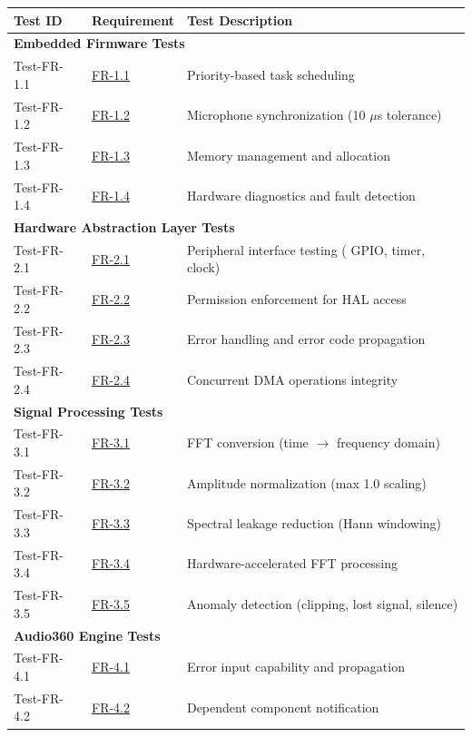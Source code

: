 \documentclass[12pt, titlepage]{article}
\begin{document}
{\small
\begin{longtable}{|p{2.5cm}|p{3cm}|p{8cm}|}
\hline
\textbf{Test ID} & \textbf{Requirement} & \textbf{Test Description} \\
\hline
\hline
\multicolumn{3}{|l|}{\textbf{Embedded Firmware Tests}} \\
\hline
Test-FR-1.1 & \hyperref[SRS-FR1_1]{FR-1.1} & Priority-based task scheduling \\
\hline
Test-FR-1.2 & \hyperref[SRS-FR1_2]{FR-1.2} & Microphone synchronization (10
$\mu$s tolerance) \\
\hline
Test-FR-1.3 & \hyperref[SRS-FR1_3]{FR-1.3} & Memory management and allocation \\
\hline
Test-FR-1.4 & \hyperref[SRS-FR1_4]{FR-1.4} & Hardware diagnostics and fault
detection \\
\hline
\hline
\multicolumn{3}{|l|}{\textbf{Hardware Abstraction Layer Tests}} \\
\hline
Test-FR-2.1 & \hyperref[SRS-FR2_1]{FR-2.1} & Peripheral interface testing (
GPIO, timer, clock) \\
\hline
Test-FR-2.2 & \hyperref[SRS-FR2_2]{FR-2.2} & Permission enforcement for HAL
access \\
\hline
Test-FR-2.3 & \hyperref[SRS-FR2_3]{FR-2.3} & Error handling and error code
propagation \\
\hline
Test-FR-2.4 & \hyperref[SRS-FR2_4]{FR-2.4} & Concurrent DMA operations integrity
\\
\hline
\hline
\multicolumn{3}{|l|}{\textbf{Signal Processing Tests}} \\
\hline
Test-FR-3.1 & \hyperref[SRS-FR3_1]{FR-3.1} & FFT conversion (time $\rightarrow$
frequency domain) \\
\hline
Test-FR-3.2 & \hyperref[SRS-FR3_2]{FR-3.2} & Amplitude normalization (max 1.0
scaling) \\
\hline
Test-FR-3.3 & \hyperref[SRS-FR3_3]{FR-3.3} & Spectral leakage reduction (Hann
windowing) \\
\hline
Test-FR-3.4 & \hyperref[SRS-FR3_4]{FR-3.4} & Hardware-accelerated FFT processing
\\
\hline
Test-FR-3.5 & \hyperref[SRS-FR3_5]{FR-3.5} & Anomaly detection (clipping, lost
signal, silence) \\
\hline
\hline
\multicolumn{3}{|l|}{\textbf{Audio360 Engine Tests}} \\
\hline
Test-FR-4.1 & \hyperref[SRS-FR4_1]{FR-4.1} & Error input capability and
propagation \\
\hline
Test-FR-4.2 & \hyperref[SRS-FR4_2]{FR-4.2} & Dependent component notification \\

\end{longtable}}
\end{document}
